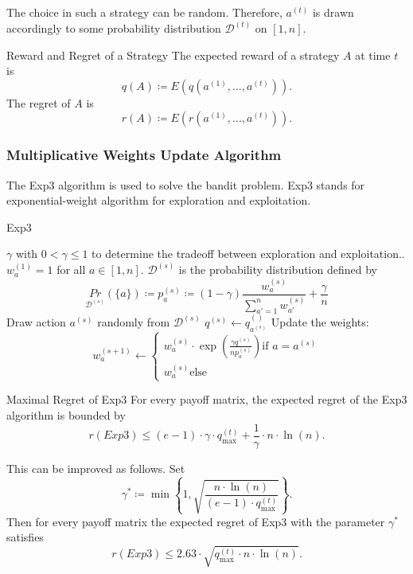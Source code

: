 \documentclass{panikzettel}
\begin{document}
The choice in such a strategy can be random. Therefore, $a^{(t)}$ is drawn accordingly to some probability distribution $\mathcal{D}^{(t)}$ on $[1,n]$.

\begin{defi}{Reward and Regret of a Strategy}
The expected reward of a strategy $A$ at time $t$ is
\[
q(A)\coloneqq E(q(a^{(1)},...,a^{(t)})).
\]
The regret of $A$ is
\[
r(A)\coloneqq E(r(a^{(1)},...,a^{(t)})).
\]
\end{defi}

\subsubsection{Multiplicative Weights Update Algorithm}
The Exp3 algorithm is used to solve the bandit problem. Exp3 stands for exponential-weight algorithm for exploration and exploitation.

\begin{halfboxl}
\vspace{-\baselineskip}
\begin{algo}{Exp3}
{
\renewcommand{\algorithmicrequire}{\textbf{Parameter:}}
\renewcommand{\algorithmicensure}{\textbf{Initialization:}}
\begin{algorithmic}[1]
 \Require $\gamma$ with $0<\gamma\leq 1$ to determine the tradeoff between exploration and exploitation..
 \Ensure $w_a^{(1)}=1$ for all $a\in[1,n]$.
   \State $\mathcal{D}^{(s)}$ is the probability distribution defined by
   \[
   \underset{\mathcal{D}^{(s)}}{Pr}(\{a\})\coloneqq p_a^{(s)}\coloneqq (1-\gamma)\frac{w_a^{(s)}}{\sum_{a'=1}^n w_{a'}^{(s)}}+\frac{\gamma}{n}
   \]
   \State Draw action $a^{(s)}$ randomly from $\mathcal{D}^{(s)}$
   \State $q^{(s)}\leftarrow q_{a^{(s)}}^{()}$ 
   \State Update the weights:
   \[
   w_a^{(s+1)}\leftarrow
   \begin{cases}
     w_a^{(s)}\cdot \exp(\frac{\gamma q^{(s)}}{n p_a^{(s)}}) \text{if } a=a^{(s)}\\
     w_a^{(s)} \text{else}
   \end{cases}
   \]
 \EndFor
\end{algorithmic}
}
\end{algo}

\end{halfboxl}
\begin{halfboxr}
\vspace{-\baselineskip}
\begin{theo}{Maximal Regret of Exp3}
For every payoff matrix, the expected regret of the Exp3 algorithm is bounded by
\[
r(Exp3)\leq(e-1)\cdot \gamma\cdot q_{\max}^{(t)}+\frac{1}{\gamma}\cdot n \cdot \ln(n).
\]

This can be improved as follows. Set
\[
\gamma^*\coloneqq \min \left\lbrace 1, \sqrt{\frac{n\cdot \ln(n)}{(e-1)\cdot q_{\max}^{(t)}} } \right\rbrace.
\]
Then for every payoff matrix the expected regret of Exp3 with the parameter $\gamma^*$ satisfies
\[
r(Exp3)\leq 2.63 \cdot \sqrt{q_{\max}^{(t)}\cdot n \cdot \ln(n)}.
\]
\end{theo}
\end{halfboxr}
\end{document}
